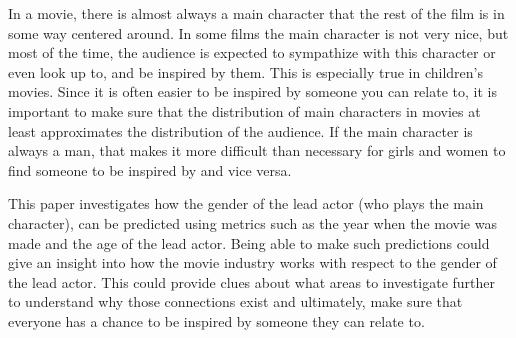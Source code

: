 \documentclass[../../project.tex]{subfiles}
\begin{document}
	In a movie, there is almost always a main character that the rest of the film is in some way centered around. In some films the main character is not very nice, but most of the time, the audience is expected to sympathize with this character or even look up to, and be inspired by them. This is especially true in children's movies. Since it is often easier to be inspired by someone you can relate to, it is important to make sure that the distribution of main characters in movies at least approximates the distribution of the audience. If the main character is always a man, that makes it more difficult than necessary for girls and women to find someone to be inspired by and vice versa.
	
	This paper investigates how the gender of the lead actor (who plays the main character), can be predicted using metrics such as the year when the movie was made and the age of the lead actor. Being able to make such predictions could give an insight into how the movie industry works with respect to the gender of the lead actor. This could provide clues about what areas to investigate further to understand why those connections exist and ultimately, make sure that everyone has a chance to be inspired by someone they can relate to.
\end{document}
